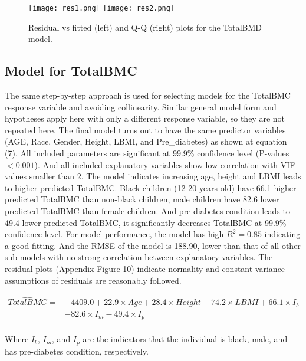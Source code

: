 \documentclass[11pt]{article}
\begin{document}
            \begin{figure}[!htbp]
            \centering \texttt{[image: res1.png]}
            \texttt{[image: res2.png]}
            \caption{Residual vs fitted (left) and Q-Q (right) plots for the TotalBMD model.}
            \label{fig:method}
            \end{figure}
            
\subsection{Model for TotalBMC}
The same step-by-step approach is used for selecting models for the TotalBMC response variable and avoiding collinearity. Similar general model form and hypotheses apply here with only a different response variable, so they are not repeated here. The final model turns out to have the same predictor variables (AGE, Race, Gender, Height, LBMI, and Pre\_diabetes) as shown at equation (7). All included parameters are significant at 99.9\% confidence level (P-values$<0.001$). And all included explanatory variables show low correlation with VIF values smaller than 2. The model indicates increasing age, height and LBMI leads to higher predicted TotalBMC. Black children (12-20 years old) have 66.1 higher predicted TotalBMC than non-black children, male children have 82.6 lower predicted TotalBMC than female children. And pre-diabetes condition leads to 49.4 lower predicted TotalBMC, it significantly decreases TotalBMC at 99.9\% confidence level. For model performance, the model has high $R^2=0.85$ indicating a good fitting. And the RMSE of the model is 188.90, lower than that of all other sub models with no strong correlation between explanatory variables. The residual plots (Appendix-Figure 10) indicate normality and constant variance assumptions of residuals are reasonably followed.  

\begin{equation}
\begin{split}
\hat{TotalBMC} = &-4409.0 +22.9\times Age +28.4\times Height +74.2\times LBMI + 66.1\times I_b \\
& -82.6\times I_m -49.4\times I_p \\
\end{split}
\end{equation}

Where $I_b$, $I_m$, and $I_p$ are the indicators that the individual is black, male, and has pre-diabetes condition, respectively.
\end{document}
